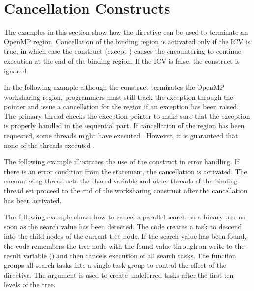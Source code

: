 \section{Cancellation Constructs}
\label{sec:cancellation}

The examples in this section show how the  directive can be used to terminate 
an OpenMP region. Cancellation of the binding region is activated only if the  ICV 
is true, in which case the  construct (except ) causes the encountering 
 to continue execution at the end of the binding region. If the  ICV is false, the 
 construct is ignored.


In the following example although the  construct terminates the OpenMP 
worksharing region, programmers must still track the exception through the pointer 
 and issue a cancellation for the  region if an exception has
been raised. The primary thread checks the exception pointer to make sure that the 
exception is properly handled in the sequential part. If cancellation of the  
region has been requested, some threads might have executed . 
However, it is guaranteed that none of the threads executed .



The following example illustrates the use of the  construct in error 
handling. If there is an error condition from the  statement, 
the cancellation is activated. The encountering thread sets the shared variable 
 and other threads of the binding thread set proceed to the end of 
the worksharing construct after the cancellation has been activated. 


The following example shows how to cancel a parallel search on a binary tree as 
soon as the search value has been detected. The code creates a task to descend 
into the child nodes of the current tree node. If the search value has been found, 
the code remembers the tree node with the found value through an  
write to the result variable () and then cancels execution of all search tasks. The
function  groups all search tasks into a single 
task group to control the effect of the  directive. The 
 argument is used to create undeferred tasks after the first ten 
levels of the tree.

